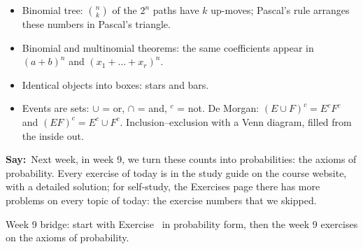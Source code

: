 \documentclass[11pt,a4paper,parskip=half]{scrartcl}
\newcommand{\say}{\textbf{\color{teal}Say:}\ }
\begin{document}
\begin{itemize}
	\item Binomial tree: $\binom nk$ of the $2^n$ paths have $k$ up-moves;
	      Pascal's rule arranges these numbers in Pascal's triangle.
	\item Binomial and multinomial theorems: the same coefficients appear in
	      $(a+b)^n$ and $(x_1+\dots+x_r)^n$.
	\item Identical objects into boxes: stars and bars.
	\item Events are sets: $\cup$ = or, $\cap$ = and, $^c$ = not. De Morgan:
	      $(E\cup F)^c = E^cF^c$ and $(EF)^c = E^c\cup F^c$.
	      Inclusion--exclusion with a Venn diagram, filled from the inside out.
\end{itemize}

\say Next week, in week 9, we turn these counts into probabilities: the
axioms of probability. Every exercise of today is in the study guide on the
course website, with a detailed solution; for self-study, the Exercises
page there has more problems on every topic of today: the exercise numbers
that we skipped.

\begin{cue}
	Week 9 bridge: start with Exercise~ in probability
	form, then the week 9 exercises on the axioms of probability.
\end{cue}
\end{document}
